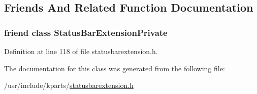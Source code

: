 \subsection{Friends And Related Function Documentation}
\hypertarget{classKParts_1_1StatusBarExtension_ad7fbe21a7ea073280f28211d53f7d775}{
\subsubsection[{Status\+Bar\+Extension\+Private}]{\setlength{\rightskip}{0pt plus 5cm}friend class Status\+Bar\+Extension\+Private\hspace{0.3cm}{\ttfamily [friend]}}}\label{classKParts_1_1StatusBarExtension_ad7fbe21a7ea073280f28211d53f7d775}


Definition at line 118 of file statusbarextension.\+h.



The documentation for this class was generated from the following file\+:\begin{DoxyCompactItemize}
\item 
/usr/include/kparts/\hyperlink{statusbarextension_8h}{statusbarextension.\+h}\end{DoxyCompactItemize}
